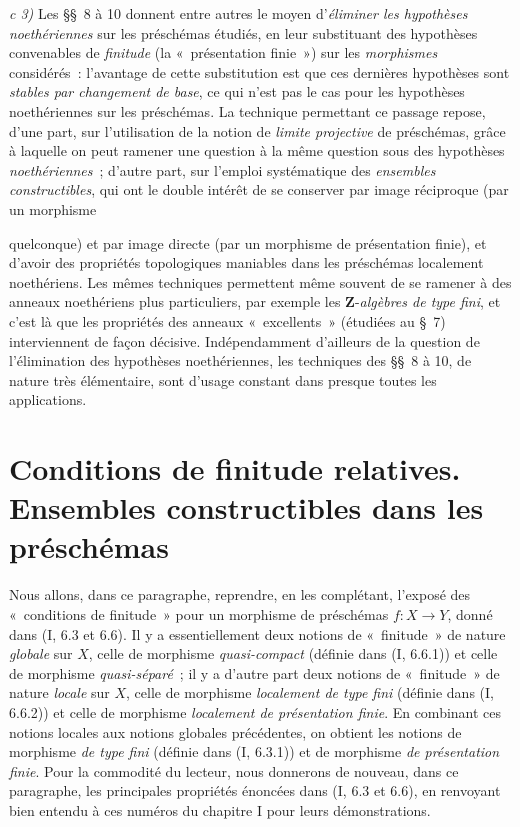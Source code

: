 \medskip
\noindent
\emph{c 3)} Les §§~8 à 10 donnent entre autres le moyen d'\emph{éliminer les
hypothèses noethériennes} sur les préschémas étudiés, en leur substituant des
hypothèses convenables de \emph{finitude} (la «~présentation finie~») sur les
\emph{morphismes} considérés~: l'avantage de cette substitution est que ces
dernières hypothèses sont \emph{stables par changement de base}, ce qui n'est
pas le cas pour les hypothèses noethériennes sur les préschémas. La technique
permettant ce passage repose, d'une part, sur l'utilisation de la notion de
\emph{limite projective} de préschémas, grâce à laquelle on peut ramener une
question à la même question sous des hypothèses \emph{noethériennes}~; d'autre
part, sur l'emploi systématique des \emph{ensembles constructibles}, qui ont
le double intérêt de se conserver par image réciproque (par un morphisme


quelconque) et par image directe (par un morphisme de présentation finie), et
d'avoir des propriétés topologiques maniables dans les préschémas localement
noethériens. Les mêmes techniques permettent même souvent de se ramener à des
anneaux noethériens plus particuliers, par exemple les
$\mathbf Z$-\emph{algèbres de type fini}, et c'est là que les propriétés des
anneaux «~excellents~» (étudiées au §~7) interviennent de façon décisive.
Indépendamment d'ailleurs de la question de l'élimination des hypothèses
noethériennes, les techniques des §§~8 à 10, de nature très élémentaire, sont
d'usage constant dans presque toutes les applications.

\setcounter{section}{0}

\section{Conditions de finitude relatives. Ensembles constructibles dans les préschémas}
\label{section:IV.1-fr}

Nous allons, dans ce paragraphe, reprendre, en les complétant, l'exposé des
«~conditions de finitude~» pour un morphisme de préschémas $f:X\to Y$, donné
dans (I, 6.3 et 6.6). Il y a essentiellement deux notions de «~finitude~» de
nature \emph{globale} sur $X$, celle de morphisme \emph{quasi-compact}
(définie dans (I, 6.6.1)) et celle de morphisme \emph{quasi-séparé}~; il y a
d'autre part deux notions de «~finitude~» de nature \emph{locale} sur $X$,
celle de morphisme \emph{localement de type fini} (définie dans (I, 6.6.2))
et celle de morphisme \emph{localement de présentation finie}. En combinant
ces notions locales aux notions globales précédentes, on obtient les notions
de morphisme \emph{de type fini} (définie dans (I, 6.3.1)) et de morphisme
\emph{de présentation finie}. Pour la commodité du lecteur, nous donnerons de
nouveau, dans ce paragraphe, les principales propriétés énoncées dans (I, 6.3
et 6.6), en renvoyant bien entendu à ces numéros du chapitre I pour leurs
démonstrations.

